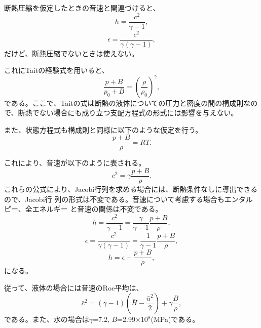 断熱圧縮を仮定したときの音速と関連づけると、
\begin{equation}
 h = \frac{c^2}{\gamma - 1},
\end{equation}
\begin{equation}
 \epsilon = \frac{c^2}{\gamma(\gamma - 1)},
\end{equation}
だけど、断熱圧縮でないときは使えない。

これにTaitの経験式を用いると、
\begin{equation}
 \frac{p + B}{p_0 + B} = \left(\frac{\rho}{\rho_0}\right)^\gamma,
\end{equation}
である。ここで、Taitの式は断熱の液体についての圧力と密度の間の構成則なの
で、断熱でない場合にも成り立つ支配方程式の形式には影響を与えない。

また、状態方程式も構成則と同様に以下のような仮定を行う。
\begin{equation}
 \frac{p + B}{\rho} = RT.
\end{equation}

これにより、音速が以下のように表される。
\begin{equation}
 c^2 = \gamma \frac{p+B}{\rho}.
\end{equation}
これらの公式により、Jacobi行列を求める場合には、断熱条件なしに導出できるので、Jacobi行
列の形式は不変である。音速について考慮する場合もエンタルピー、全エネルギー
と音速の関係は不変である。
\begin{equation}
 h = \frac{c^2}{\gamma - 1}
  =\frac{\gamma}{\gamma - 1}\frac{p + B}{\rho},
\end{equation}
\begin{equation}
 \epsilon = \frac{c^2}{\gamma(\gamma - 1)}
  =\frac{1}{\gamma - 1}\frac{p + B}{\rho},
\end{equation}
\begin{equation}
 h = \epsilon + \frac{p + B}{\rho},
\end{equation}
になる。

従って、液体の場合には音速のRoe平均は、
\begin{equation}
 \bar{c}^2 = (\gamma - 1) \left(\bar{H} - \frac{\bar{u}^2}{2}\right) + \gamma\frac{B}{\bar{\rho}},
\end{equation}
である。また、水の場合は$\gamma$=7.2, $B$=2.99$\times$10$^8$(MPa)である。
